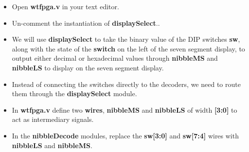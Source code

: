 \documentclass[12pt,a4paper]{article}
\begin{document}
\begin{itemize}
	\item Open \textbf{wtfpga.v} in your text editor. 
	\item Un-comment the instantiation of \textbf{displaySelect}..
	\item We will use \textbf{displaySelect} to take the binary value of the DIP switches \textbf{sw}, along with the state of the \textbf{switch} on the left of the seven segment display, to output either decimal or hexadecimal values through \textbf{nibbleMS} and \textbf{nibbleLS} to display on the seven segment display. 
	\item Instead of connecting the switches directly to the decoders, we need to route them through the \textbf{displaySelect} module. 
	\item In \textbf{wtfpga.v} define two \textbf{wires}, \textbf{nibbleMS} and \textbf{nibbleLS} of width \textbf{[3:0]} to act as intermediary signals.
	\item In the \textbf{nibbleDecode} modules, replace the \textbf{sw[3:0]} and \textbf{sw[7:4]} wires with \textbf{nibbleLS} and \textbf{nibbleMS}.	
\end{itemize} 
\end{document}

